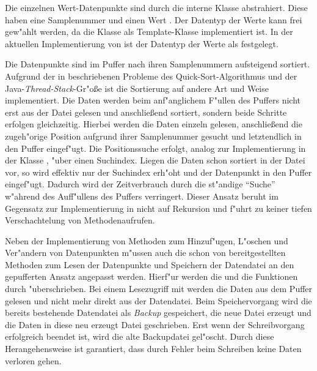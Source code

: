 Die einzelnen Wert-Datenpunkte sind durch die interne Klasse  abstrahiert.
Diese haben eine Samplenummer  und einen Wert .
Der Datentyp der Werte kann frei gew"ahlt werden, da die Klasse  als Template-Klasse implementiert ist.
In der aktuellen Implementierung von  ist der Datentyp der Werte als  festgelegt.

Die Datenpunkte sind im Puffer  nach ihren Samplenummern aufsteigend sortiert.
Aufgrund der in  beschriebenen Probleme des Quick-Sort-Algorithmus und der Java-\emph{Thread-Stack}-Gr"o{\ss}e ist die Sortierung auf andere Art und Weise implementiert.
Die Daten werden beim anf"anglichem F"ullen des Puffers nicht erst aus der Datei gelesen und anschlie{\ss}end sortiert, sondern beide Schritte erfolgen gleichzeitig.
Hierbei werden die Daten einzeln gelesen, anschlie{\ss}end die zugeh"orige Position aufgrund ihrer Samplenummer gesucht und letztendlich in den Puffer eingef"ugt.
Die Positionssuche erfolgt, analog zur Implementierung in der Klasse , "uber einen Suchindex.
Liegen die Daten schon sortiert in der Datei vor, so wird effektiv nur der Suchindex erh"oht und der Datenpunkt in den Puffer eingef"ugt.
Dadurch wird der Zeitverbrauch durch die st"andige "`Suche"' w"ahrend des Auff"ullens des Puffers verringert.
Dieser Ansatz beruht im Gegensatz zur Implementierung in  nicht auf Rekursion und f"uhrt zu keiner tiefen Verschachtelung von Methodenaufrufen.

Neben der Implementierung von Methoden zum Hinzuf"ugen, L"oschen und Ver"andern von Datenpunkten m"ussen auch die schon von  bereitgestellten Methoden zum Lesen der Datenpunkte und Speichern der Datendatei an den gepufferten Ansatz angepasst werden.
Hierf"ur werden die  und die  Funktionen durch  "uberschrieben.
Bei einem Lesezugriff mit  werden die Daten aus dem Puffer gelesen und nicht mehr direkt aus der Datendatei.
Beim Speichervorgang wird die bereits bestehende Datendatei als \emph{Backup} gespeichert, die neue Datei erzeugt und die Daten in diese neu erzeugt Datei geschrieben.
Erst wenn der Schreibvorgang erfolgreich beendet ist, wird die alte Backupdatei gel"oscht.
Durch diese Herangehensweise ist garantiert, dass durch Fehler beim Schreiben keine Daten verloren gehen.


